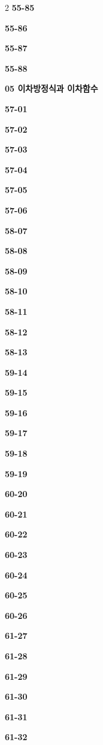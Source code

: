 \documentclass[10pt,a4paper]{article}
\begin{document}
\begin{multicols}{2}
\noindent\textbf{55-85}\ \par
\noindent\textbf{55-86}\ \par
\noindent\textbf{55-87}\ \par
\noindent\textbf{55-88}\ \par
\noindent\textbf{05 이차방정식과 이차함수}\par\smallskip
\noindent\textbf{57-01}\ \par
\noindent\textbf{57-02}\ \par
\noindent\textbf{57-03}\ \par
\noindent\textbf{57-04}\ \par
\noindent\textbf{57-05}\ \par
\noindent\textbf{57-06}\ \par
\noindent\textbf{58-07}\ \par
\noindent\textbf{58-08}\ \par
\noindent\textbf{58-09}\ \par
\noindent\textbf{58-10}\ \par
\noindent\textbf{58-11}\ \par
\noindent\textbf{58-12}\ \par
\noindent\textbf{58-13}\ \par
\noindent\textbf{59-14}\ \par
\noindent\textbf{59-15}\ \par
\noindent\textbf{59-16}\ \par
\noindent\textbf{59-17}\ \par
\noindent\textbf{59-18}\ \par
\noindent\textbf{59-19}\ \par
\noindent\textbf{60-20}\ \par
\noindent\textbf{60-21}\ \par
\noindent\textbf{60-22}\ \par
\noindent\textbf{60-23}\ \par
\noindent\textbf{60-24}\ \par
\noindent\textbf{60-25}\ \par
\noindent\textbf{60-26}\ \par
\noindent\textbf{61-27}\ \par
\noindent\textbf{61-28}\ \par
\noindent\textbf{61-29}\ \par
\noindent\textbf{61-30}\ \par
\noindent\textbf{61-31}\ \par
\noindent\textbf{61-32}\ \par

\end{multicols}
\end{document}

